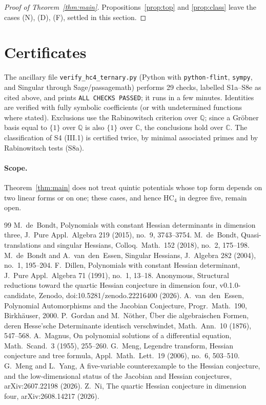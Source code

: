 \documentclass[11pt]{article}
\theoremstyle{remark}
\newcommand{\C}{\mathbb{C}}
\begin{document}
\begin{proof}[Proof of Theorem~\ref{thm:main}]
Propositions~\ref{prop:top} and \ref{prop:class} leave the cases (N), (D), (F), settled in this section.
\end{proof}

\section{Certificates}\label{sec:cert}
The ancillary file \texttt{verify\_hc4\_ternary.py} (Python with \texttt{python-flint}, \texttt{sympy}, and Singular through Sage/passagemath) performs 29 checks, labelled S1a--S8e as cited above, and prints \texttt{ALL CHECKS PASSED}; it runs in a few minutes. Identities are verified with fully symbolic coefficients (or with undetermined functions where stated). Exclusions use the Rabinowitsch criterion over $\mathbb{Q}$; since a Gr\"obner basis equal to $\{1\}$ over $\mathbb{Q}$ is also $\{1\}$ over $\C$, the conclusions hold over $\C$. The classification of S4 (III.1) is certified twice, by minimal associated primes and by Rabinowitsch tests (S8a).

\paragraph{Scope.} Theorem~\ref{thm:main} does not treat quintic potentials whose top form depends on two linear forms or on one; these cases, and hence $\mathrm{HC}_4$ in degree five, remain open.

\begin{thebibliography}{99}
 M.~de~Bondt, Polynomials with constant Hessian determinants in dimension three, J.~Pure Appl.\ Algebra 219 (2015), no.~9, 3743--3754.
 M.~de~Bondt, Quasi-translations and singular Hessians, Colloq.\ Math.\ 152 (2018), no.~2, 175--198.
 M.~de~Bondt and A.~van~den~Essen, Singular Hessians, J.~Algebra 282 (2004), no.~1, 195--204.
 F.~Dillen, Polynomials with constant Hessian determinant, J.~Pure Appl.\ Algebra 71 (1991), no.~1, 13--18.
 Anonymous, Structural reductions toward the quartic Hessian conjecture in dimension four, v0.1.0-candidate, Zenodo, doi:10.5281/zenodo.22216400 (2026).
 A.~van~den~Essen, Polynomial Automorphisms and the Jacobian Conjecture, Progr.\ Math.\ 190, Birkh\"auser, 2000.
 P.~Gordan and M.~N\"other, \"Uber die algebraischen Formen, deren Hesse'sche Determinante identisch verschwindet, Math.\ Ann.\ 10 (1876), 547--568.
 A.~Magnus, On polynomial solutions of a differential equation, Math.\ Scand.\ 3 (1955), 255--260.
 G.~Meng, Legendre transform, Hessian conjecture and tree formula, Appl.\ Math.\ Lett.\ 19 (2006), no.~6, 503--510.
 G.~Meng and L.~Yang, A five-variable counterexample to the Hessian conjecture, and the low-dimensional status of the Jacobian and Hessian conjectures, arXiv:2607.22198 (2026).
 Z.~Ni, The quartic Hessian conjecture in dimension four, arXiv:2608.14217 (2026).
\end{thebibliography}
\end{document}
